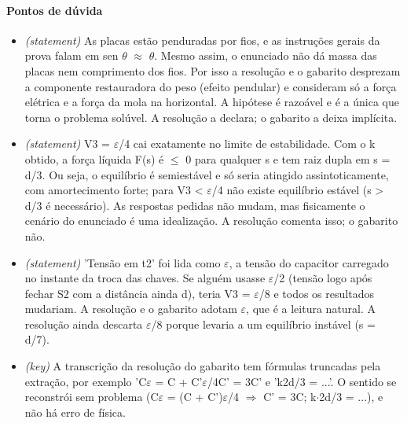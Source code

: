 \documentclass{article}%
\begin{document}
\paragraph{Pontos de dúvida}%
\begin{itemize}%
\item%
\textit{(statement)} As placas estão penduradas por fios, e as instruções gerais da prova falam em sen $\theta$ $\approx$ $\theta$. Mesmo assim, o enunciado não dá massa das placas nem comprimento dos fios. Por isso a resolução e o gabarito desprezam a componente restauradora do peso (efeito pendular) e consideram só a força elétrica e a força da mola na horizontal. A hipótese é razoável e é a única que torna o problema solúvel. A resolução a declara; o gabarito a deixa implícita.%
\item%
\textit{(statement)} V3 = $\varepsilon$/4 cai exatamente no limite de estabilidade. Com o k obtido, a força líquida F(s) é $\leq$ 0 para qualquer s e tem raiz dupla em s = d/3. Ou seja, o equilíbrio é semiestável e só seria atingido assintoticamente, com amortecimento forte; para V3 < $\varepsilon$/4 não existe equilíbrio estável (s > d/3 é necessário). As respostas pedidas não mudam, mas fisicamente o cenário do enunciado é uma idealização. A resolução comenta isso; o gabarito não.%
\item%
\textit{(statement)} 'Tensão em t2' foi lida como $\varepsilon$, a tensão do capacitor carregado no instante da troca das chaves. Se alguém usasse $\varepsilon$/2 (tensão logo após fechar S2 com a distância ainda d), teria V3 = $\varepsilon$/8 e todos os resultados mudariam. A resolução e o gabarito adotam $\varepsilon$, que é a leitura natural. A resolução ainda descarta $\varepsilon$/8 porque levaria a um equilíbrio instável (s = d/7).%
\item%
\textit{(key)} A transcrição da resolução do gabarito tem fórmulas truncadas pela extração, por exemplo 'C$\varepsilon$ = C + C'$\varepsilon$/4C' = 3C' e 'k2d/3 = ...'. O sentido se reconstrói sem problema (C$\varepsilon$ = (C + C')$\varepsilon$/4 $\Rightarrow$ C' = 3C; k$\cdot$2d/3 = ...), e não há erro de física.%
\end{itemize}%
\end{document}
